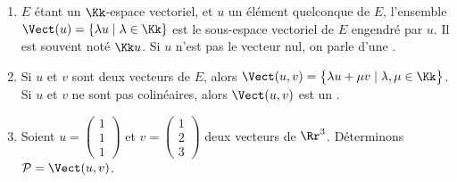 \documentclass[class=report,crop=false]{standalone}
\begin{document}
\begin{exemple}
\sauteligne
\begin{enumerate}
  \item $E$ étant un $\Kk$-espace vectoriel, et $u$ un élément quelconque de $E$,
l'ensemble $\Vect (u) =\{ \lambda u \mid \lambda \in \Kk \}$ est
le sous-espace vectoriel de $E$ engendré par $u$.
Il est souvent noté $\Kk u$. Si $u$ n'est pas le vecteur nul,
on parle d'une .



  \item Si $u$ et $v$ sont deux vecteurs de $E$, alors
  $\Vect (u,v) = \big\{ \lambda u + \mu v \mid \lambda, \mu \in \Kk \big\}$.
  Si $u$ et $v$ ne sont pas colinéaires, alors $\Vect (u,v)$ est un .

  \item Soient $u = \left(\begin{smallmatrix}1 \\ 1 \\ 1 \end{smallmatrix}\right)$
  et $v = \left(\begin{smallmatrix}1 \\ 2 \\ 3 \end{smallmatrix}\right)$
  deux vecteurs de $\Rr^3$.
  Déterminons $\mathcal{P} = \Vect (u,v)$.


\end{enumerate}
\end{exemple}
\end{document}
